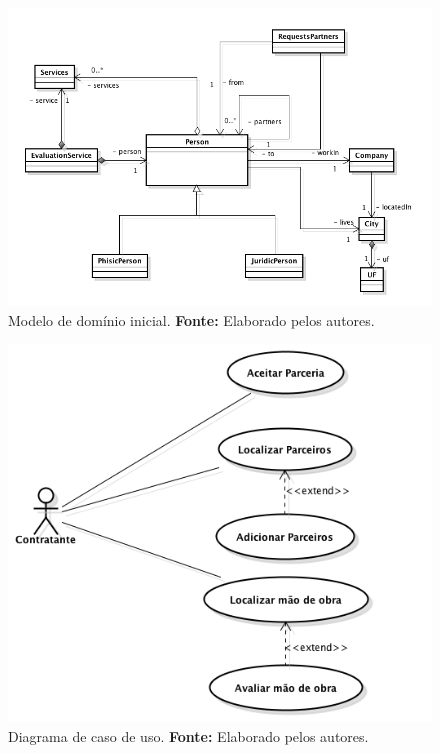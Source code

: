 \newpage
\begin{figure}[h!]
	\centerline{\includegraphics[scale=0.45]{./imagens/modelo-dominio-inicial.png}}
	\caption[Modelo de domínio inicial]
	{Modelo de domínio inicial. \textbf{Fonte:} Elaborado pelos autores.}
	\label{fig:exemplo1}
\end{figure}

\begin{figure}[h!]
	\centerline{\includegraphics[scale=0.6]{./imagens/caso-de-uso.png}}
	\caption[Diagrama de caso de uso]
	{Diagrama de caso de uso. \textbf{Fonte:} Elaborado pelos autores.}
	\label{fig:exemplo1}
\end{figure}

